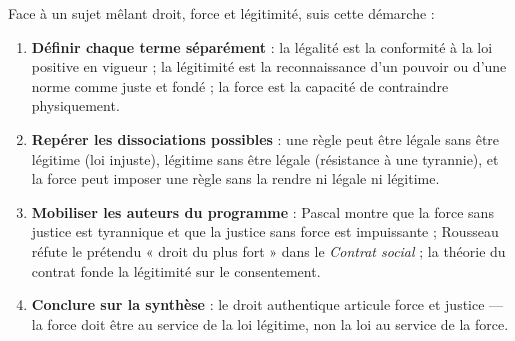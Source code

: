 \documentclass[11pt]{article}
\newcommand{\cle}[1]{{\popxbold\color{popdark}#1}}
\begin{document}
\begin{methode}
Face à un sujet mêlant droit, force et légitimité, suis cette démarche :
\begin{enumerate}
\item \textbf{Définir chaque terme séparément} : la \cle{légalité} est la conformité à la loi positive en vigueur ; la \cle{légitimité} est la reconnaissance d'un pouvoir ou d'une norme comme juste et fondé ; la \cle{force} est la capacité de contraindre physiquement.
\item \textbf{Repérer les dissociations possibles} : une règle peut être légale sans être légitime (loi injuste), légitime sans être légale (résistance à une tyrannie), et la force peut imposer une règle sans la rendre ni légale ni légitime.
\item \textbf{Mobiliser les auteurs du programme} : Pascal montre que la force sans justice est tyrannique et que la justice sans force est impuissante ; Rousseau réfute le prétendu « droit du plus fort » dans le \emph{Contrat social} ; la théorie du contrat fonde la légitimité sur le consentement.
\item \textbf{Conclure sur la synthèse} : le droit authentique articule force et justice — la force doit être au service de la loi légitime, non la loi au service de la force.
\end{enumerate}
\end{methode}
\end{document}
